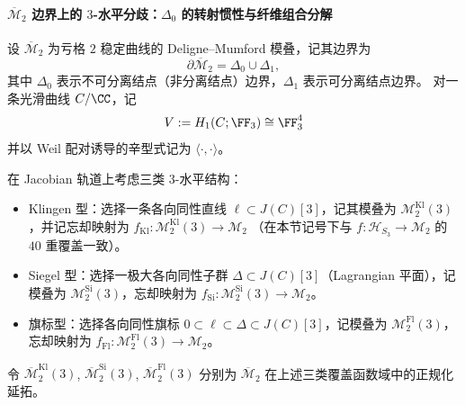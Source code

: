 \paragraph{\texorpdfstring{$\overline{\mathcal M}_2$}{M2bar} 边界上的 \texorpdfstring{$3$}{3}-水平分歧：\texorpdfstring{$\Delta_0$}{Delta0} 的转射惯性与纤维组合分解}
设 \(\overline{\mathcal M}_2\) 为亏格 \(2\) 稳定曲线的 Deligne--Mumford 模叠，记其边界为
\[
\partial\overline{\mathcal M}_2=\Delta_0\cup \Delta_1,
\]
其中 \(\Delta_0\) 表示不可分离结点（非分离结点）边界，\(\Delta_1\) 表示可分离结点边界。
对一条光滑曲线 \(C/\CC\)，记
\[
V:=H_1(C;\FF_3)\cong \FF_3^4
\]
并以 Weil 配对诱导的辛型式记为 \(\langle\cdot,\cdot\rangle\)。
\par
在 Jacobian 轨道上考虑三类 \(3\)-水平结构：
\begin{itemize}
  \item Klingen 型：选择一条各向同性直线 \(\ell\subset J(C)[3]\)，记其模叠为 \(\mathcal M_2^{\mathrm{Kl}}(3)\)，并记忘却映射为
  \(
  f_{\mathrm{Kl}}:\mathcal M_2^{\mathrm{Kl}}(3)\to \mathcal M_2
  \)
  （在本节记号下与 \(f:\mathcal H_{S_3}\to\mathcal M_2\) 的 \(40\) 重覆盖一致）。
  \item Siegel 型：选择一极大各向同性子群 \(\Delta\subset J(C)[3]\)（Lagrangian 平面），记模叠为 \(\mathcal M_2^{\mathrm{Si}}(3)\)，忘却映射为
  \(
  f_{\mathrm{Si}}:\mathcal M_2^{\mathrm{Si}}(3)\to \mathcal M_2
  \)。
  \item 旗标型：选择各向同性旗标 \(0\subset \ell\subset \Delta\subset J(C)[3]\)，记模叠为 \(\mathcal M_2^{\mathrm{Fl}}(3)\)，忘却映射为
  \(
  f_{\mathrm{Fl}}:\mathcal M_2^{\mathrm{Fl}}(3)\to \mathcal M_2
  \)。
\end{itemize}
令
\(
\overline{\mathcal M}_2^{\mathrm{Kl}}(3)\),
\(
\overline{\mathcal M}_2^{\mathrm{Si}}(3)\),
\(
\overline{\mathcal M}_2^{\mathrm{Fl}}(3)
\)
分别为 \(\overline{\mathcal M}_2\) 在上述三类覆盖函数域中的正规化延拓。

